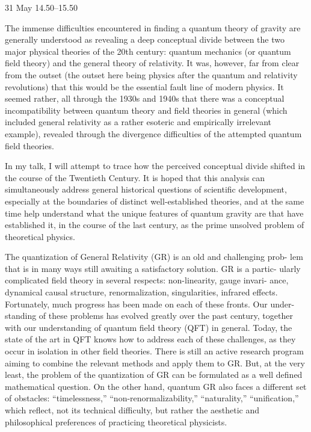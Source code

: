 \documentclass{conference}
\begin{document}
\begin{Day}{31 May}
    {14.50--15.50}
    {The immense difficulties encountered in finding a quantum theory of gravity are generally understood as revealing a deep conceptual divide between the two major physical theories of the 20th century: quantum mechanics (or quantum field theory) and the general theory of relativity.
It was, however, far from clear from the outset (the outset here being physics after the quantum and relativity revolutions) that this would be the essential fault line of modern physics. It seemed rather, all through the 1930s and 1940s that there was a conceptual incompatibility between quantum theory and field theories in general (which included general relativity as a rather esoteric and empirically irrelevant example), revealed through the divergence difficulties of the attempted quantum field theories.

In my talk, I will attempt to trace how the perceived conceptual divide shifted in the course of the Twentieth Century. It is hoped that this analysis can simultaneously address general historical questions of scientific development, especially at the boundaries of distinct well-established theories, and at the same time help understand what the unique features of quantum gravity are that have established it, in the course of the last century, as the prime unsolved problem of theoretical physics.}


    {The quantization of General Relativity (GR) is an old and challenging prob- lem that is in many ways still awaiting a satisfactory solution. GR is a partic- ularly complicated field theory in several respects: non-linearity, gauge invari- ance, dynamical causal structure, renormalization, singularities, infrared effects. Fortunately, much progress has been made on each of these fronts. Our under- standing of these problems has evolved greatly over the past century, together with our understanding of quantum field theory (QFT) in general. Today, the state of the art in QFT knows how to address each of these challenges, as they occur in isolation in other field theories. There is still an active research program aiming to combine the relevant methods and apply them to GR. But, at the very least, the problem of the quantization of GR can be formulated as a well defined mathematical question. On the other hand, quantum GR also faces a different set of obstacles: “timelessness,” “non-renormalizability,” “naturality,” “unification,” which reflect, not its technical difficulty, but rather the aesthetic and philosophical preferences of practicing theoretical physicists.

}
\end{Day}
\end{document}
